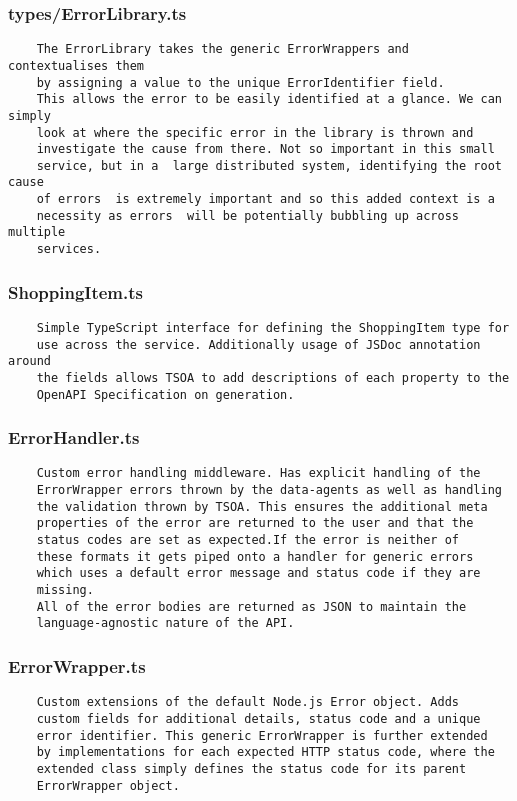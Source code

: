 \subsubsection{types/ErrorLibrary.ts}
\begin{verbatim}
    The ErrorLibrary takes the generic ErrorWrappers and contextualises them
    by assigning a value to the unique ErrorIdentifier field. 
    This allows the error to be easily identified at a glance. We can simply 
    look at where the specific error in the library is thrown and 
    investigate the cause from there. Not so important in this small 
    service, but in a  large distributed system, identifying the root cause
    of errors  is extremely important and so this added context is a 
    necessity as errors  will be potentially bubbling up across multiple 
    services.
\end{verbatim}
\subsubsection{ShoppingItem.ts}

\begin{verbatim}
    Simple TypeScript interface for defining the ShoppingItem type for
    use across the service. Additionally usage of JSDoc annotation around
    the fields allows TSOA to add descriptions of each property to the
    OpenAPI Specification on generation.
\end{verbatim}
\subsubsection{ErrorHandler.ts}
\begin{verbatim}
    Custom error handling middleware. Has explicit handling of the
    ErrorWrapper errors thrown by the data-agents as well as handling
    the validation thrown by TSOA. This ensures the additional meta
    properties of the error are returned to the user and that the 
    status codes are set as expected.If the error is neither of 
    these formats it gets piped onto a handler for generic errors
    which uses a default error message and status code if they are
    missing.
    All of the error bodies are returned as JSON to maintain the
    language-agnostic nature of the API.
\end{verbatim}
\subsubsection{ErrorWrapper.ts}
\begin{verbatim}
    Custom extensions of the default Node.js Error object. Adds
    custom fields for additional details, status code and a unique
    error identifier. This generic ErrorWrapper is further extended
    by implementations for each expected HTTP status code, where the
    extended class simply defines the status code for its parent
    ErrorWrapper object.
\end{verbatim}
